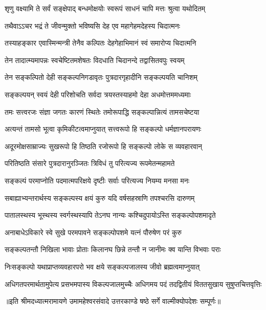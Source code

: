 

\addtocounter{shlokacount}{39}

\twolineshloka
{शृणु वक्ष्यामि ते सर्वं सङ्क्षेपाद् बन्धमोक्षयोः}
{स्वरूपं साधनं चापि मत्तः श्रुत्वा यथोदितम्} %

\twolineshloka
{तथैवाऽऽचर भद्रं ते जीवन्मुक्तो भविष्यसि}
{देह एव महागेहमदेहस्य चिदात्मनः} %

\twolineshloka
{तस्याहङ्कार एवास्मिन्मन्त्री तेनैव कल्पितः}
{देहगेहाभिमानं स्वं समारोप्य चिदात्मनि} %

\twolineshloka
{तेन तादात्म्यमापन्नः स्वचेष्टितमशेषतः}
{विदधाति चिदानन्दे तद्वासितवपुः स्वयम्} %

\twolineshloka
{तेन सङ्कल्पितो देही सङ्कल्पनिगडावृतः}
{पुत्रदारगृहादीनि सङ्कल्पयति चानिशम्} %

\twolineshloka
{सङ्कल्पयन् स्वयं देही परिशोचति सर्वदा}
{त्रयस्तस्याहमो देहा अधमोत्तममध्यमाः} %

\twolineshloka
{तमः सत्त्वरजः संज्ञा जगतः कारणं स्थितेः}
{तमोरूपाद्धि सङ्कल्पान्नित्यं तामसचेष्टया} %

\twolineshloka
{अत्यन्तं तामसो भूत्वा कृमिकीटत्वमाप्नुयात्}
{सत्त्वरूपो हि सङ्कल्पो धर्मज्ञानपरायणः} %

\twolineshloka
{अदूरमोक्षसाम्राज्यः सुखरूपो हि तिष्ठति}
{रजोरूपो हि सङ्कल्पो लोके स व्यवहारवान्} %

\twolineshloka
{परितिष्ठति संसारे पुत्रदारानुरञ्जितः}
{त्रिविधं तु परित्यज्य रूपमेतन्महामते} %

\twolineshloka
{सङ्कल्पं परमाप्नोति पदमात्मपरिक्षये}
{दृष्टीः सर्वाः परित्यज्य नियम्य मनसा मनः} %

\twolineshloka
{सबाह्याभ्यन्तरार्थस्य सङ्कल्पस्य क्षयं कुरु}
{यदि वर्षसहस्राणि तपश्चरसि दारुणम्} %

\twolineshloka
{पातालस्थस्य भूस्थस्य स्वर्गस्थस्यापि तेऽनघ}
{नान्यः कश्चिदुपायोऽस्ति सङ्कल्पोपशमादृते} %

\twolineshloka
{अनाबाधेऽविकारे स्वे सुखे परमपावने}
{सङ्कल्पोपशमे यत्नं पौरुषेण परं कुरु} %

\twolineshloka
{सङ्कल्पतन्तौ निखिला भावाः प्रोताः किलानघ}
{छिन्ने तन्तौ न जानीमः क्व यान्ति विभवाः पराः} %

\twolineshloka
{निःसङ्कल्पो यथाप्राप्तव्यवहारपरो भव}
{क्षये सङ्कल्पजालस्य जीवो ब्रह्मत्वमाप्नुयात्} %

\fourlineindentedshloka
{अधिगतपरमार्थतामुपेत्य}
{प्रसभमपास्य विकल्पजालमुच्चैः}
{अधिगमय पदं तदद्वितीयं}
{विततसुखाय सुषुप्तचित्तवृत्तिः} %

{॥इति श्रीमदध्यात्मरामायणे उमामहेश्वरसंवादे उत्तरकाण्डे षष्ठे
सर्गे वाल्मीक्योपदेशः  सम्पूर्णः॥}
